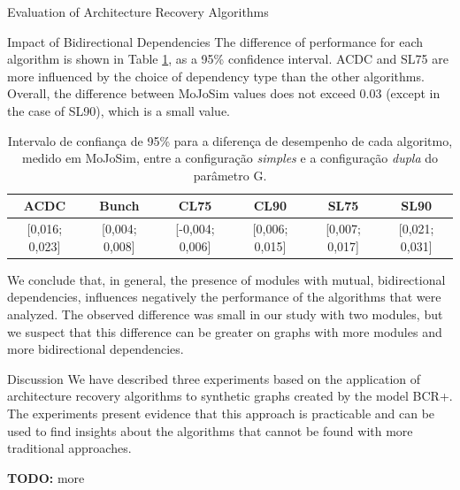 \documentclass[11pt,twocolumn,a4paper,english]{article}
\newcommand{\TODO}{\textbf{TODO:} }
\begin{document}
\begin{section}{Evaluation of Architecture Recovery Algorithms}
\begin{subsection}{Impact of Bidirectional Dependencies}
	The difference of performance for each algorithm is shown in Table \ref{tab:exp-dependencies}, as a 95\% confidence interval. ACDC and SL75 are more influenced by the choice of dependency type than the other algorithms. Overall, the difference between MoJoSim values does not exceed 0.03 (except in the case of SL90), which is a small value.
	
	\begin{table}[width=\textwidth]
	  \begin{center}
	  \begin{tabular}{cccccc}
	    \hline
	    \textbf{ACDC} & \textbf{Bunch} & \textbf{CL75} & \textbf{CL90} & \textbf{SL75} & \textbf{SL90} \\
	    \hline
	    \hline
	    \footnotesize{[0,016; 0,023]} & \footnotesize{[0,004; 0,008]} & \footnotesize{[-0,004; 0,006]} & \footnotesize{[0,006; 0,015]} & \footnotesize{[0,007; 0,017]} & \footnotesize{[0,021; 0,031]} \\
	    \hline
	  \end{tabular}
	  \end{center}
	  \caption{Intervalo de confiança de 95\% para a diferença de desempenho de cada algoritmo, medido em MoJoSim, entre a configuração \emph{simples} e a configuração \emph{dupla} do parâmetro G.}
	  \label{tab:exp-dependencies}
	\end{table}
	
	We conclude that, in general, the presence of modules with mutual, bidirectional dependencies, influences negatively the performance of the algorithms that were analyzed. The observed difference was small in our study with two modules, but we suspect that this difference can be greater on graphs with more modules and more bidirectional dependencies.
	
\end{subsection}

\begin{subsection}{Discussion}
	We have described three experiments based on the application of architecture recovery algorithms to synthetic graphs created by the model BCR+. The experiments present evidence that this approach is practicable and can be used to find insights about the algorithms that cannot be found with more traditional approaches.
	
	\TODO more
	
\end{subsection}

\end{section}
\end{document}
